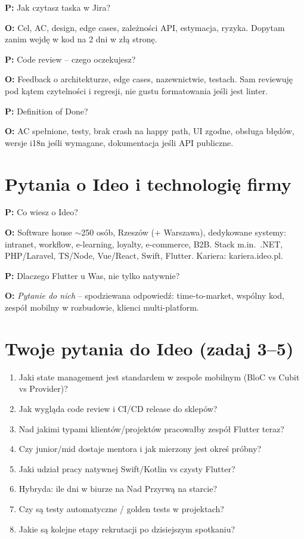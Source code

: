 \documentclass[11pt,a4paper]{article}
\newcommand{\pyt}[1]{\par\medskip\noindent\textbf{P:} #1\par}
\newcommand{\odp}[1]{\noindent\textbf{O:} #1\par}
\begin{document}
\pyt{Jak czytasz taska w Jira?}
\odp{Cel, AC, design, edge cases, zależności API, estymacja, ryzyka. Dopytam zanim wejdę w kod na 2 dni w złą stronę.}

\pyt{Code review -- czego oczekujesz?}
\odp{Feedback o architekturze, edge cases, nazewnictwie, testach. Sam reviewuję pod kątem czytelności i regresji, nie gustu formatowania jeśli jest linter.}

\pyt{Definition of Done?}
\odp{AC spełnione, testy, brak crash na happy path, UI zgodne, obsługa błędów, wersje i18n jeśli wymagane, dokumentacja jeśli API publiczne.}

\section{Pytania o Ideo i technologię firmy}

\pyt{Co wiesz o Ideo?}
\odp{Software house $\sim$250 osób, Rzeszów (+ Warszawa), dedykowane systemy: intranet, workflow, e-learning, loyalty, e-commerce, B2B. Stack m.in.\ .NET, PHP/Laravel, TS/Node, Vue/React, Swift, Flutter. Kariera: kariera.ideo.pl.}

\pyt{Dlaczego Flutter u Was, nie tylko natywnie?}
\odp{\textit{Pytanie do nich} -- spodziewana odpowiedź: time-to-market, wspólny kod, zespół mobilny w rozbudowie, klienci multi-platform.}

\section{Twoje pytania do Ideo (zadaj 3--5)}

\begin{enumerate}[leftmargin=*]
  \item Jaki state management jest standardem w zespole mobilnym (BloC vs Cubit vs Provider)?
  \item Jak wygląda code review i CI/CD release do sklepów?
  \item Nad jakimi typami klientów/projektów pracowałby zespół Flutter teraz?
  \item Czy junior/mid dostaje mentora i jak mierzony jest okreś próbny?
  \item Jaki udział pracy natywnej Swift/Kotlin vs czysty Flutter?
  \item Hybryda: ile dni w biurze na Nad Przyrwą na starcie?
  \item Czy są testy automatyczne / golden tests w projektach?
  \item Jakie są kolejne etapy rekrutacji po dzisiejszym spotkaniu?
\end{enumerate}
\end{document}
